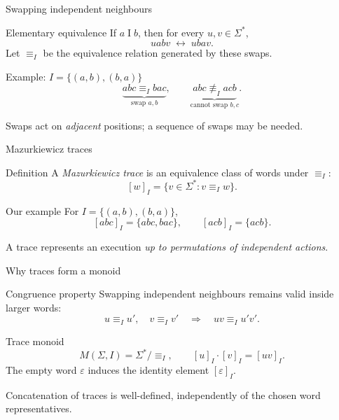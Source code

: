 \documentclass[t,11pt]{beamer}
\newcommand{\ind}{\mathrel{I}}
\begin{document}
\begin{frame}{Swapping independent neighbours}
  \begin{block}{Elementary equivalence}
    If $a\ind b$, then for every $u,v\in\Sigma^*$,
    \[
      uabv \;\longleftrightarrow\; ubav.
    \]
    Let $\equiv_I$ be the equivalence relation generated by these swaps.
  \end{block}
  \begin{block}{Example: $I=\{(a,b),(b,a)\}$}
    \[
    \underbrace{abc\equiv_I bac}_{\text{swap }a,b},
    \qquad
    \underbrace{abc\not\equiv_I acb}_{\text{cannot swap }b,c}.
    \]
  \end{block}
  Swaps act on \emph{adjacent} positions; a sequence of swaps may be needed.
\end{frame}

\begin{frame}{Mazurkiewicz traces}
  \begin{block}{Definition}
    A \emph{Mazurkiewicz trace} is an equivalence class of words under $\equiv_I$:
    \[
      [w]_I=\{v\in\Sigma^*:v\equiv_I w\}.
    \]
  \end{block}
  \begin{block}{Our example}
    For $I=\{(a,b),(b,a)\}$,
    \[
      [abc]_I=\{abc,bac\},\qquad [acb]_I=\{acb\}.
    \]
  \end{block}
  \vspace{0.25cm}
  A trace represents an execution \emph{up to permutations of independent actions}.
\end{frame}

\begin{frame}{Why traces form a monoid}
  \begin{block}{Congruence property}
    Swapping independent neighbours remains valid inside larger words:
    \[
      u\equiv_Iu',\quad v\equiv_Iv'
      \quad\Longrightarrow\quad uv\equiv_Iu'v'.
    \]
  \end{block}
  \begin{block}{Trace monoid}
    \[
      M(\Sigma,I)=\Sigma^*/{\equiv_I},\qquad
      [u]_I\cdot[v]_I=[uv]_I.
    \]
    The empty word $\varepsilon$ induces the identity element $[\varepsilon]_I$.
  \end{block}
  \vspace{0.15cm}
  Concatenation of traces is well-defined, independently of the chosen word representatives.
\end{frame}
\end{document}
